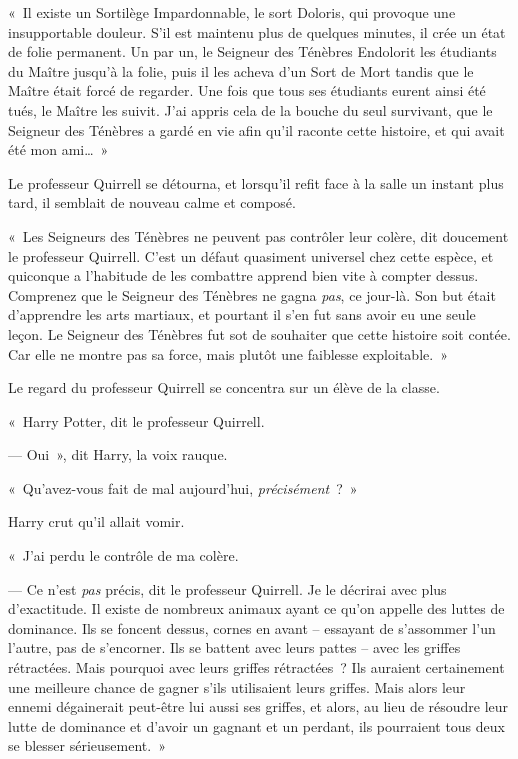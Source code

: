 «~Il existe un Sortilège Impardonnable, le sort Doloris, qui provoque une insupportable douleur. S'il est maintenu plus de quelques minutes, il crée un état de folie permanent. Un par un, le Seigneur des Ténèbres Endolorit les étudiants du Maître jusqu'à la folie, puis il les acheva d'un Sort de Mort tandis que le Maître était forcé de regarder. Une fois que tous ses étudiants eurent ainsi été tués, le Maître les suivit. J'ai appris cela de la bouche du seul survivant, que le Seigneur des Ténèbres a gardé en vie afin qu'il raconte cette histoire, et qui avait été mon ami…~»

Le professeur Quirrell se détourna, et lorsqu'il refit face à la salle un instant plus tard, il semblait de nouveau calme et composé.

«~Les Seigneurs des Ténèbres ne peuvent pas contrôler leur colère, dit doucement le professeur Quirrell. C'est un défaut quasiment universel chez cette espèce, et quiconque a l'habitude de les combattre apprend bien vite à compter dessus. Comprenez que le Seigneur des Ténèbres ne gagna \emph{pas}, ce jour-là. Son but était d'apprendre les arts martiaux, et pourtant il s'en fut sans avoir eu une seule leçon. Le Seigneur des Ténèbres fut sot de souhaiter que cette histoire soit contée. Car elle ne montre pas sa force, mais plutôt une faiblesse exploitable.~»

Le regard du professeur Quirrell se concentra sur un élève de la classe.

«~Harry Potter, dit le professeur Quirrell.

--- Oui~», dit Harry, la voix rauque.

«~Qu'avez-vous fait de mal aujourd'hui, \emph{précisément}~?~»

Harry crut qu'il allait vomir.

«~J'ai perdu le contrôle de ma colère.

--- Ce n'est \emph{pas} précis, dit le professeur Quirrell. Je le décrirai avec plus d'exactitude. Il existe de nombreux animaux ayant ce qu'on appelle des luttes de dominance. Ils se foncent dessus, cornes en avant -- essayant de s'assommer l'un l'autre, pas de s'encorner. Ils se battent avec leurs pattes -- avec les griffes rétractées. Mais pourquoi avec leurs griffes rétractées~? Ils auraient certainement une meilleure chance de gagner s'ils utilisaient leurs griffes. Mais alors leur ennemi dégainerait peut-être lui aussi ses griffes, et alors, au lieu de résoudre leur lutte de dominance et d'avoir un gagnant et un perdant, ils pourraient tous deux se blesser sérieusement.~»

